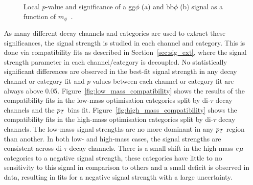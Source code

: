 \begin{figure}[!hbtp]
\centering
\caption[Plots of the local $p$-value and significance for gluon fusion and b-associated production.]{Local $p$-value and significance of a gg$\phi$ (a) and bb$\phi$ (b) signal as a function of $m_{\phi}$~\cite{CMS:2022rbd}.}
\label{fig:significance}
\end{figure}

As many different decay channels and categories are used to extract these significances, the signal strength is studied in each channel and category.
This is done via compatibility fits as described in Section~\ref{sec:sig_ext}, where the signal strength parameter in each channel/category is decoupled.
No statistically significant differences are observed in the best-fit signal strength in any decay channel or category fit and $p$-values between each channel or category fit are always above 0.05.
Figure~\ref{fig:low_mass_compatibility} shows the results of the compatibility fits in the low-mass optimisation categories split by di-$\tau$ decay channels and the $p_{T}$ bins fit. 
Figure~\ref{fig:high_mass_compatibility} shows the compatibility fits in the high-mass optimisation categories split by di-$\tau$ decay channels.
The low-mass signal strengths are no more dominant in any $p_{T}$ region than another.
In both low- and high-mass cases, the signal strengths are consistent across di-$\tau$ decay channels.
There is a small shift in the high mass $e_{}\mu_{}$ categories to a negative signal strength, these categories have little to no sensitivity to this signal in comparison to others and a small deficit is observed in data, resulting in fits for a negative signal strength with a large uncertainty. 


